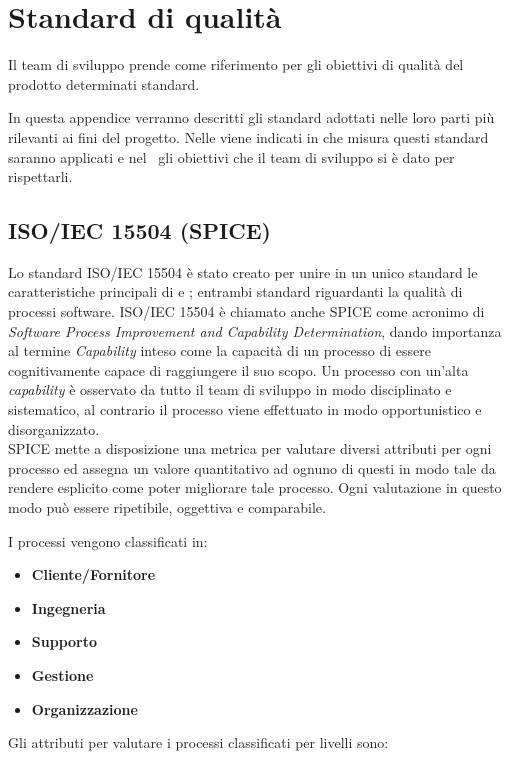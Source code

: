 \newpage
\section{Standard di qualità}
Il team di sviluppo prende come riferimento per gli obiettivi di qualità del prodotto determinati standard.

In questa appendice verranno descritti gli standard adottati nelle loro parti più rilevanti ai fini del progetto. Nelle \Doc{\NdP} viene indicati in che misura questi standard saranno applicati e nel \PdQ~gli obiettivi che il team di sviluppo si è dato per rispettarli.

	\subsection{ISO/IEC 15504 (SPICE)}
	Lo standard ISO/IEC 15504 è stato creato per unire in un unico standard le caratteristiche principali di  e ; entrambi standard riguardanti la qualità di processi software.
	ISO/IEC 15504 è chiamato anche SPICE come acronimo di \textit{Software Process Improvement and Capability Determination}, dando importanza al termine \textit{Capability} inteso come la capacità di un processo di essere cognitivamente capace di raggiungere il suo scopo. Un processo con un'alta \textit{capability} è osservato da tutto il team di sviluppo in modo disciplinato e sistematico, al contrario il processo viene effettuato in modo opportunistico e disorganizzato.\\
	
	SPICE mette a disposizione una metrica per valutare diversi attributi per ogni processo ed assegna un valore quantitativo ad ognuno di questi in modo tale da rendere esplicito come poter migliorare tale processo. Ogni valutazione in questo modo può essere ripetibile, oggettiva e comparabile.
	
	I processi vengono classificati in:
	
	\begin{itemize}
		\item \textbf{Cliente/Fornitore}
		\item \textbf{Ingegneria}
		\item \textbf{Supporto}
		\item \textbf{Gestione}
		\item \textbf{Organizzazione}
	\end{itemize}
	
	Gli attributi per valutare i processi classificati per livelli sono:
	

